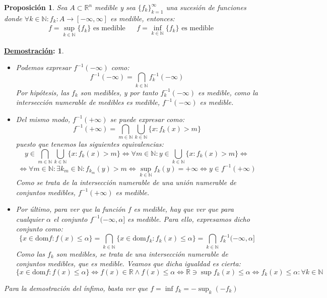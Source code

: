 \documentclass[10pt,a4paper,openright]{book}
\theoremstyle{break}
\newtheorem*{prop}{Proposición}
\newtheorem*{demo}{\underline{Demostración}:}
\begin{document}
\begin{prop}
Sea $A \subset \mathbb{R}^n$ medible y sea $\{f_k\}_{k=1}^\infty$ una sucesión de funciones donde $\forall k \in \mathbb{N}: f_k: A \rightarrow \left[-\infty, \infty\right]$ es medible, entonces:
\begin{align*}
f = \sup_{k\in \mathbb{N}} \{f_k\} \text{ es medible} & & f = \inf_{k\in \mathbb{N}} \{f_k\} \text{ es medible}
\end{align*}
\end{prop}
\begin{demo}
\begin{itemize}
\item Podemos expresar $f^{-1}\left(-\infty\right)$ como:
$$f^{-1}\left(-\infty\right) = \bigcap_{k \in \mathbb{N}}f^{-1}_k\left(-\infty\right)$$
Por hipótesis, las $f_k$ son medibles, y por tanto $f^{-1}_k(-\infty)$ es medible, como la intersección numerable de medibles es medible, $f^{-1}\left(-\infty\right)$ es medible.

\item Del mismo modo, $f^{-1}\left(+\infty\right)$ se puede expresar como:
$$f^{-1}\left(+\infty\right) = \bigcap_{m \in \mathbb{N}}\bigcup_{k \in \mathbb{N}}\{x : f_k \left(x\right) > m\}$$
puesto que tenemos las siguientes equivalencias:
$$y \in \bigcap_{m \in \mathbb{N}}\bigcup_{k \in \mathbb{N}}\{x : f_k \left(x\right) > m\} \Leftrightarrow \forall m\in \mathbb{N}: y \in \bigcup_{k \in \mathbb{N}}\{x: f_k\left(x\right) > m\} \Leftrightarrow$$ 
$$\Leftrightarrow \forall m \in \mathbb{N}:\exists k_m\in \mathbb{N}: f_{k_m}\left(y\right) > m \Leftrightarrow \sup_{k\in \mathbb{N}} f_k\left(y\right) = +\infty \Leftrightarrow y \in f^{-1}\left(+\infty\right)$$
Como se trata de la intersección numerable de una unión numerable de conjuntos medibles, $f^{-1}\left(+\infty\right)$ es medible. 

\item Por último, para ver que la función $f$ es medible, hay que ver que para cualquier $\alpha$ el conjunto $f^{-1}(-\infty, \alpha]$ es medible. Para ello, expresamos dicho conjunto como:   
$$\{x \in \mathrm{dom}f: f\left(x\right) \le \alpha\} = \bigcap_{k \in \mathbb{N}}\{x \in \mathrm{dom} f_k: f_k\left(x\right) \le \alpha\} = \bigcap_{k\in \mathbb{N}}f_k^{-1}(-\infty, \alpha]$$ Como las $f_k$ son medibles, se trata de una intersección numerable de conjuntos medibles, que es medible. Veamos que dicha igualdad es cierta:
$$\{x \in \mathrm{dom}f: f\left(x\right) \le \alpha\} \Leftrightarrow f\left(x\right) \in \mathbb{R} \wedge f\left(x\right) \le \alpha \Leftrightarrow \mathbb{R} \ni \sup f_k\left(x\right) \le \alpha \Leftrightarrow f_k\left(x\right) \le \alpha : \forall k \in \mathbb{N}$$
\end{itemize}

Para la demostración del ínfimo, basta ver que $f = \inf f_k = -\sup_k \left(-f_k\right)$
\end{demo}
\end{document}

